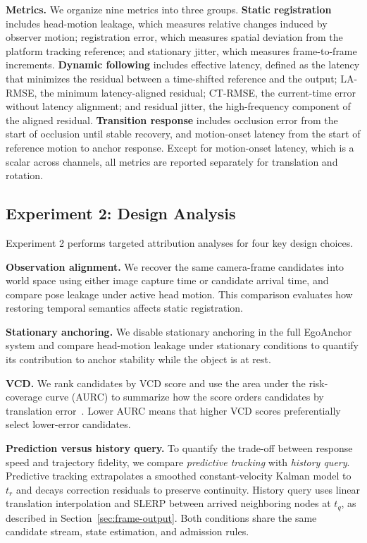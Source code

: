 \documentclass[review]{vgtc}
\begin{document}
\textbf{Metrics.}
We organize nine metrics into three groups. \textbf{Static registration} includes head-motion leakage, which measures relative changes induced by observer motion; registration error, which measures spatial deviation from the platform tracking reference; and stationary jitter, which measures frame-to-frame increments. \textbf{Dynamic following} includes effective latency, defined as the latency that minimizes the residual between a time-shifted reference and the output; LA-RMSE, the minimum latency-aligned residual; CT-RMSE, the current-time error without latency alignment; and residual jitter, the high-frequency component of the aligned residual. \textbf{Transition response} includes occlusion error from the start of occlusion until stable recovery, and motion-onset latency from the start of reference motion to anchor response. Except for motion-onset latency, which is a scalar across channels, all metrics are reported separately for translation and rotation.

\subsection{Experiment 2: Design Analysis}\label{sec:exp2-design}

Experiment 2 performs targeted attribution analyses for four key design choices.

\textbf{Observation alignment.}
We recover the same camera-frame candidates into world space using either image capture time or candidate arrival time, and compare pose leakage under active head motion. This comparison evaluates how restoring temporal semantics affects static registration.

\textbf{Stationary anchoring.}
We disable stationary anchoring in the full EgoAnchor system and compare head-motion leakage under stationary conditions to quantify its contribution to anchor stability while the object is at rest.

\textbf{VCD.}
We rank candidates by VCD score and use the area under the risk-coverage curve (AURC) to summarize how the score orders candidates by translation error~\cite{riskcontrolled2020,ding2020uncertainty}. Lower AURC means that higher VCD scores preferentially select lower-error candidates.

\textbf{Prediction versus history query.}
To quantify the trade-off between response speed and trajectory fidelity, we compare \emph{predictive tracking} with \emph{history query}. Predictive tracking extrapolates a smoothed constant-velocity Kalman model to $t_r$ and decays correction residuals to preserve continuity. History query uses linear translation interpolation and SLERP between arrived neighboring nodes at $t_q$, as described in Section~\ref{sec:frame-output}. Both conditions share the same candidate stream, state estimation, and admission rules.
\end{document}

